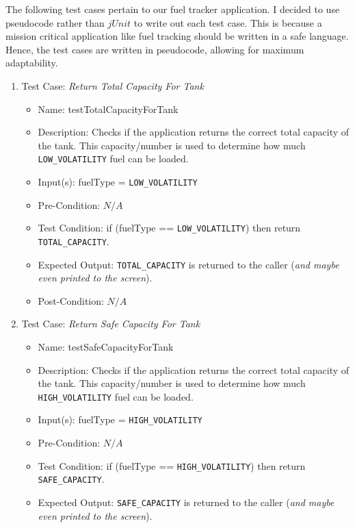\documentclass{article}
\begin{document}
The following test cases pertain to our fuel tracker application. I decided to use pseudocode rather than $jUnit$ to write out each test case. This is because a mission critical application like fuel tracking should be written in a safe language. Hence, the test cases are written in pseudocode, allowing for maximum adaptability.

\begin{enumerate}

    \item Test Case: \textit{Return Total Capacity For Tank}
        \begin{itemize}
            \item Name: testTotalCapacityForTank
            \item Description: Checks if the application returns the correct total capacity of the tank. This capacity/number is used to determine how much \texttt{LOW\_VOLATILITY} fuel can be loaded.
            \item Input(s): fuelType = \texttt{LOW\_VOLATILITY}
            \item Pre-Condition: $N/A$
            \item Test Condition: if (fuelType == \texttt{LOW\_VOLATILITY}) then return \texttt{TOTAL\_CAPACITY}.
            \item Expected Output: \texttt{TOTAL\_CAPACITY} is returned to the caller (\textit{and maybe even printed to the screen}).
            \item Post-Condition: $N/A$
        \end{itemize}
    \item Test Case: \textit{Return Safe Capacity For Tank}
        \begin{itemize}
            \item Name: testSafeCapacityForTank
            \item Description: Checks if the application returns the correct total capacity of the tank. This capacity/number is used to determine how much \texttt{HIGH\_VOLATILITY} fuel can be loaded.
            \item Input(s): fuelType = \texttt{HIGH\_VOLATILITY}
            \item Pre-Condition: $N/A$
            \item Test Condition: if (fuelType == \texttt{HIGH\_VOLATILITY}) then return \texttt{SAFE\_CAPACITY}.
            \item Expected Output: \texttt{SAFE\_CAPACITY} is returned to the caller (\textit{and maybe even printed to the screen}).

\end{itemize}
\end{enumerate}
\end{document}
